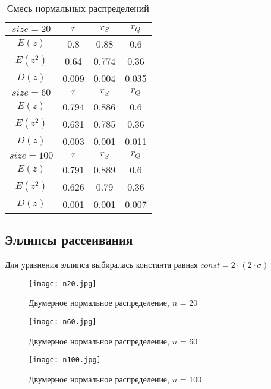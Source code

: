 \documentclass{article}
\begin{document}
	
	\begin{table}[H]
		\centering
		\begin{tabular}{| c | c | c | c |}
			
			\hline
			$size = 20$ & $r$      & $r_{S}$ & $r_{Q}$ \\
			\hline
			$E(z)$      & 0.8   & 0.88  & 0.6   \\
            $E(z^{2})$    & 0.64  & 0.774 & 0.36  \\
            $D(z)$      & 0.009 & 0.004 & 0.035 \\
			\hline
			$size = 60$ & $r$      & $r_{S}$ & $r_{Q}$ \\
			\hline
			$E(z)$      & 0.794 & 0.886 & 0.6   \\
            $E(z^{2})$    & 0.631 & 0.785 & 0.36  \\
            $D(z)$      & 0.003 & 0.001 & 0.011 \\
			\hline
			$size = 100$ & $r$      & $r_{S}$ & $r_{Q}$ \\
			\hline
			$E(z)$       & 0.791 & 0.889 & 0.6   \\
            $E(z^{2})$     & 0.626 & 0.79  & 0.36  \\
            $D(z)$       & 0.001 & 0.001 & 0.007 \\
			\hline
			
		\end{tabular}{}
		\caption{Смесь нормальных распределений}
		\label{tab:mix_normal}
	\end{table}
	
\subsection{Эллипсы рассеивания}
\noindent Для уравнения эллипса выбиралась константа равная $const = 2 \cdot (2 \cdot \sigma)$
	
	\begin{figure}[H]
		\centering
		\texttt{[image: n20.jpg]}
		\caption{Двумерное нормальное распределение, $n$ = 20}
		\label{fig:n20}
	\end{figure}
	
	\begin{figure}[H]
		\centering
		\texttt{[image: n60.jpg]}
		\caption{Двумерное нормальное распределение, $n$ = 60}
		\label{fig:n60}
	\end{figure}

	\begin{figure}[H]
		\centering
		\texttt{[image: n100.jpg]}
		\caption{Двумерное нормальное распределение, $n$ = 100}
		\label{fig:n100}
	\end{figure}
\end{document}
